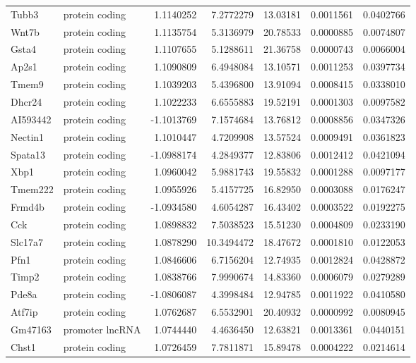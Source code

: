 \documentclass[onehalf,12pt]{beavtex}
\begin{document}
\begin{longtable}{llrrrrr}
  Tubb3 & protein coding & 1.1140252 & 7.2772279 & 13.03181 & 0.0011561 & 0.0402766\\
  \addlinespace
  Wnt7b & protein coding & 1.1135754 & 5.3136979 & 20.78533 & 0.0000885 & 0.0074807\\
  Gsta4 & protein coding & 1.1107655 & 5.1288611 & 21.36758 & 0.0000743 & 0.0066004\\
  Ap2s1 & protein coding & 1.1090809 & 6.4948084 & 13.10571 & 0.0011253 & 0.0397734\\
  Tmem9 & protein coding & 1.1039203 & 5.4396800 & 13.91094 & 0.0008415 & 0.0338010\\
  Dhcr24 & protein coding & 1.1022233 & 6.6555883 & 19.52191 & 0.0001303 & 0.0097582\\
  \addlinespace
  AI593442 & protein coding & -1.1013769 & 7.1574684 & 13.76812 & 0.0008856 & 0.0347326\\
  Nectin1 & protein coding & 1.1010447 & 4.7209908 & 13.57524 & 0.0009491 & 0.0361823\\
  Spata13 & protein coding & -1.0988174 & 4.2849377 & 12.83806 & 0.0012412 & 0.0421094\\
  Xbp1 & protein coding & 1.0960042 & 5.9881743 & 19.55832 & 0.0001288 & 0.0097177\\
  Tmem222 & protein coding & 1.0955926 & 5.4157725 & 16.82950 & 0.0003088 & 0.0176247\\
  \addlinespace
  Frmd4b & protein coding & -1.0934580 & 4.6054287 & 16.43402 & 0.0003522 & 0.0192275\\
  Cck & protein coding & 1.0898832 & 7.5038523 & 15.51230 & 0.0004809 & 0.0233190\\
  Slc17a7 & protein coding & 1.0878290 & 10.3494472 & 18.47672 & 0.0001810 & 0.0122053\\
  Pfn1 & protein coding & 1.0846606 & 6.7156204 & 12.74935 & 0.0012824 & 0.0428872\\
  Timp2 & protein coding & 1.0838766 & 7.9990674 & 14.83360 & 0.0006079 & 0.0279289\\
  \addlinespace
  Pde8a & protein coding & -1.0806087 & 4.3998484 & 12.94785 & 0.0011922 & 0.0410580\\
  Atf7ip & protein coding & 1.0762687 & 6.5532901 & 20.40932 & 0.0000992 & 0.0080945\\
  Gm47163 & promoter lncRNA & 1.0744440 & 4.4636450 & 12.63821 & 0.0013361 & 0.0440151\\
  Chst1 & protein coding & 1.0726459 & 7.7811871 & 15.89478 & 0.0004222 & 0.0214614\\

\end{longtable}
\end{document}
